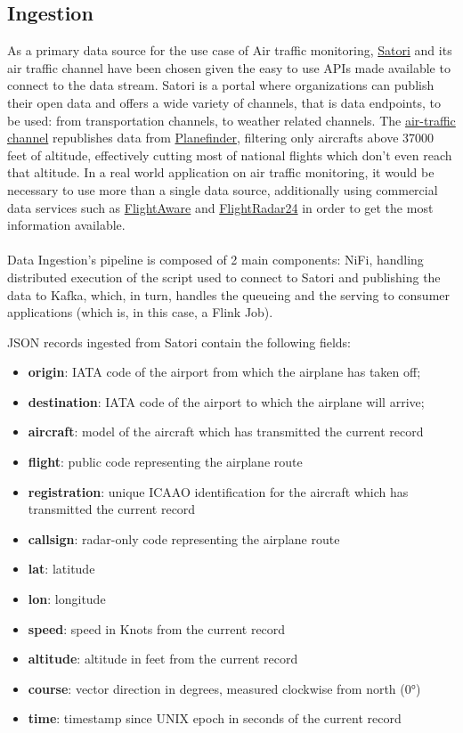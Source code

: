 \subsection{Ingestion}

As a primary data source for the use case of Air traffic monitoring, \href{https://www.satori.com/}{Satori} and its air traffic channel have been chosen given the easy to use APIs made available to connect to the data stream. Satori is a portal where organizations can publish their open data and offers a wide variety of channels, that is data endpoints, to be used: from transportation channels, to weather related channels. The \href{https://www.satori.com/channels/air-traffic}{air-traffic channel} republishes data from \href{https://planefinder.net/}{Planefinder}, filtering only aircrafts above 37000 feet of altitude, effectively cutting most of national flights which don't even reach that altitude. In a real world application on air traffic monitoring, it would be necessary to use more than a single data source, additionally using commercial data services such as \href{http://flightaware.com/}{FlightAware} and \href{http://flightradar24.com/}{FlightRadar24} in order to get the most information available.
\\\\
Data Ingestion's pipeline is composed of 2 main components: NiFi, handling distributed execution of the script used to connect to Satori and publishing the data to Kafka, which, in turn, handles the queueing and the serving to consumer applications (which is, in this case, a Flink Job).

JSON records ingested from Satori contain the following fields:

\begin{itemize}
    \item \textbf{origin}: IATA code of the airport from which the airplane has taken off;
    \item \textbf{destination}: IATA code of the airport to which the airplane will arrive;
    \item \textbf{aircraft}: model of the aircraft which has transmitted the current record
    \item \textbf{flight}: public code representing the airplane route
    \item \textbf{registration}: unique ICAAO identification for the aircraft which has transmitted the current record    
    \item \textbf{callsign}: radar-only code representing the airplane route
    \item \textbf{lat}: latitude
    \item \textbf{lon}: longitude
    \item \textbf{speed}: speed in Knots from the current record
    \item \textbf{altitude}: altitude in feet from the current record
    \item \textbf{course}: vector direction in degrees, measured clockwise from north (0°)
    \item \textbf{time}: timestamp since UNIX epoch in seconds of the current record
\end{itemize}


